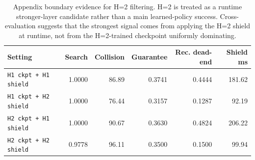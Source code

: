 \begin{table}[t]
\centering
\caption{Appendix boundary evidence for H=2 filtering. H=2 is treated as a runtime stronger-layer candidate rather than a main learned-policy success. Cross-evaluation suggests that the strongest signal comes from applying the H=2 shield at runtime, not from the H=2-trained checkpoint uniformly dominating.}
\label{tab:appendix-h2-boundary}
\small
\begin{tabular}{lrrrrr}
\toprule
Setting & Search & Collision & Guarantee & Rec. dead-end & Shield ms \\
\midrule
\texttt{H1 ckpt + H1 shield} & 1.0000 & 86.89 & 0.3741 & 0.4444 & 181.62 \\
\texttt{H1 ckpt + H2 shield} & 1.0000 & 76.44 & 0.3157 & 0.1287 & 92.19 \\
\texttt{H2 ckpt + H1 shield} & 1.0000 & 90.67 & 0.3630 & 0.4824 & 206.22 \\
\texttt{H2 ckpt + H2 shield} & 0.9778 & 96.11 & 0.3500 & 0.1500 & 99.94 \\
\bottomrule
\end{tabular}
\end{table}
